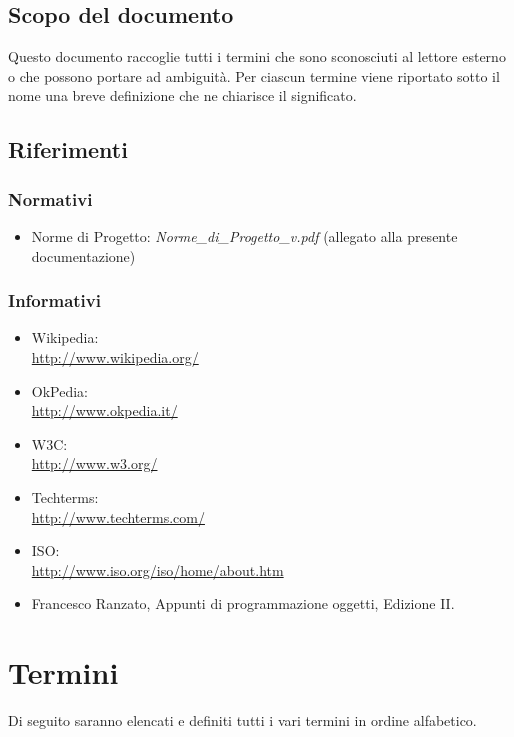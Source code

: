\subsection{Scopo del documento}%
\label{1.1}
Questo documento raccoglie tutti i termini che sono sconosciuti al lettore esterno o che possono portare ad ambiguità. Per ciascun termine viene riportato sotto il nome una breve definizione che ne chiarisce il significato.
\subsection{Riferimenti} %
\label{1.4}
\subsubsection{Normativi} %
\label{1.4.1}
\begin{itemize}
\item Norme di Progetto: \emph{Norme\_{}di\_{}Progetto\_{}v\versioneNormeDiProgetto{}.pdf}  (allegato alla presente documentazione)\\
\end{itemize}
\subsubsection{Informativi} %
\label{1.4.2}
\begin{itemize}
\item Wikipedia:\\ \url{ http://www.wikipedia.org/}
\item OkPedia:\\ \url{ http://www.okpedia.it/}
\item W3C:\\ \url{http://www.w3.org/}
\item Techterms:\\ \url{http://www.techterms.com/}
\item ISO:\\ \url{http://www.iso.org/iso/home/about.htm}
\item Francesco Ranzato, Appunti di programmazione oggetti, Edizione II.\\
\end{itemize}

\newpage
\section{Termini}
Di seguito saranno elencati e definiti tutti i vari termini in ordine alfabetico.







